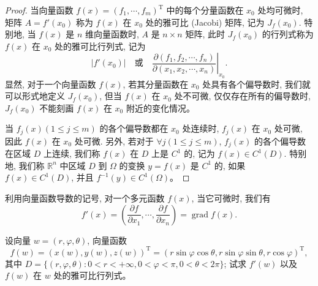 \documentclass[12pt,fontset=fandol]{ctexart}
\begin{document}
\begin{proof}
当向量函数 $f(x)=(f_1,\cdots,f_m)^\mathrm T$ 中的每个分量函数在 $x_0$ 处均可微时, 矩阵 $A=f'(x_0)$ 称为 $f(x)$ 在 $x_0$ 处的雅可比 (Jacobi) 矩阵, 记为 $J_f(x_0)$. 特别地, 当 $f(x)$ 是 $n$ 维向量函数时, $A$ 是 $n\times n$ 矩阵, 此时 $J_f(x_0)$ 的行列式称为 $f(x)$ 在 $x_0$ 处的雅可比行列式, 记为
\[
  |f'(x_0)|\quad\text{或}\quad
  \left.\frac{\partial(f_1,f_2,\cdots,f_n)}{\partial(x_1,x_2,\cdots,x_n)}\right|_{x_0}.
\]
显然, 对于一个向量函数 $f(x)$, 若其分量函数在 $x_0$ 处具有各个偏导数时, 我们就可以形式地定义 $J_f(x_0)$, 但当 $f(x)$ 在 $x_0$ 处不可微, 仅仅存在所有的偏导数时, $J_f(x_0)$ 不能刻画 $f(x)$ 在 $x_0$ 附近的变化情况。

当 $f_j(x)(1\leqslant j\leqslant m)$ 的各个偏导数都在 $x_0$ 处连续时, $f_j(x)$ 在 $x_0$ 处可微, 因此 $f(x)$ 在 $x_0$ 处可微. 另外, 若对于 $\forall j(1\leqslant j\leqslant m)$, $f_j(x)$ 的各个偏导数在区域 $D$ 上连续, 我们称 $f(x)$ 在 $D$ 上是 $C^1$ 的, 记为 $f(x)\in C^1(D)$. 特别地, 我们称 $\mathbb R^n$ 中区域 $D$ 到 $\Omega$ 的变换 $y=f(x)$ 是 $C^1$ 的, 如果 $f(x)\in C^1(D)$, 并且 $f^{-1}(y)\in C^1(\Omega)$。

\end{proof}
\begin{remark}\quad 利用向量函数导数的记号, 对一个多元函数 $f(x)$, 当它可微时, 我们有
\[
  f'(x)=\left(\frac{\partial f}{\partial x_1},\cdots,\frac{\partial f}{\partial x_n}\right)=\operatorname{grad}f(x).
\]

\end{remark}
\begin{example}\label{course-example-14-1-8}\quad 设向量 $w=(r,\varphi,\theta)$, 向量函数
\[
  f(w)=(x(w),y(w),z(w))^\mathrm T
  =(r\sin\varphi\cos\theta,r\sin\varphi\sin\theta,r\cos\varphi)^\mathrm T,
\]
其中 $D=\{(r,\varphi,\theta):0<r<+\infty,0<\varphi<\pi,0<\theta<2\pi\}$; 试求 $f'(w)$ 以及 $f(w)$ 在 $w$ 处的雅可比行列式。

\end{example}
\end{document}
